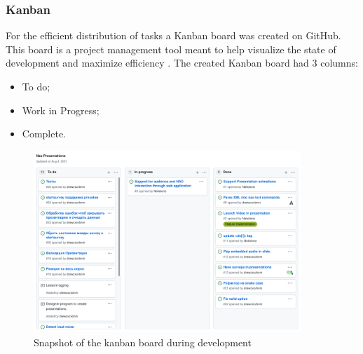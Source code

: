 \documentclass[12pt, fleqn, a4paper]{article}
\begin{document}
\subsubsection{Kanban}
For the efficient distribution of tasks a Kanban board was created on GitHub. This board is a project management tool meant to help visualize the state of development and maximize efficiency \citep{degrandis_demaria_2017}. The created Kanban board had 3 columns:
\begin{itemize}
	\item To do;
	\item Work in Progress;
	\item Complete.
\end{itemize}
\begin{figure}[H]
	\centering
	\includegraphics[width=0.9\textwidth]{img/kanban_board.png}
	\caption{Snapshot of the kanban board during development}
\end{figure}
\end{document}
